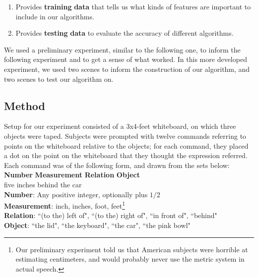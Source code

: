 \documentclass[12pt,letterpaper]{article}
\newcommand\tab[1][1cm]{\hspace*{#1}}
\begin{document}
\begin{enumerate}[(1)]

\item Provides \textbf{training} \textbf{data} that tells us what kinds of features are important to include in our algorithms.\\
\item Provides \textbf{testing} \textbf{data} to evaluate the accuracy of different algorithms.
\end{enumerate}

We used a preliminary experiment, similar to the following one, to inform the following experiment and to get a sense of what worked. In this more developed experiment, we used two scenes to inform the construction of our algorithm, and two scenes to test our algorithm on.

\subsection{Method}

Setup for our experiment consisted of a 3x4-feet whiteboard, on which three objects were taped. Subjects were prompted with twelve commands referring to points on the whiteboard relative to the objects; for each command, they placed a dot on the point on the whiteboard that they thought the expression referred. Each command was of the following form, and drawn from the sets below:\\

\noindent \textbf{Number} \tab	\textbf{Measurement}	 \tab	\textbf{Relation} \tab		\textbf{Object}\\
five		\tab \tab  	inches	\tab\tab\tab   	behind	\tab	 	the car\\

\noindent \textbf{Number}: Any positive integer, optionally plus $1/2$ \\
\textbf{Measurement}: inch, inches, foot, feet\footnote{Our preliminary experiment told us that American subjects were horrible at estimating centimeters, and would probably never use the metric system in actual speech.}\\
\textbf{Relation}: ``(to the) left of", ``(to the) right of", ``in front of", ``behind"\\
\textbf{Object}: ``the lid", ``the keyboard", ``the car", ``the pink bowl"\\
\end{document}
